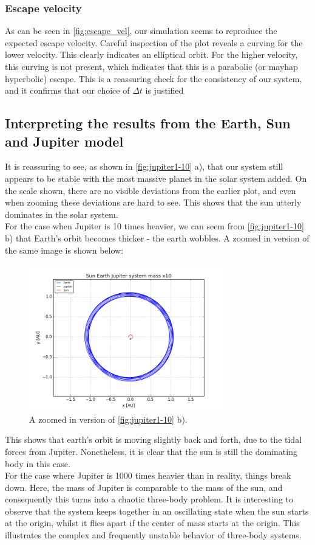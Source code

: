 \documentclass[a4paper, 10pt]{article}
\begin{document}
\subsubsection{Escape velocity}
As can be seen in \cref{fig:escape_vel}, our simulation seems to reproduce the expected escape velocity. Careful inspection of the plot reveals a curving for the lower velocity. This clearly indicates an elliptical orbit. For the higher velocity, this curving is not present, which indicates that this is a parabolic (or mayhap hyperbolic) escape. This is a reassuring check for the consistency of our system, and it confirms that our choice of $\Delta t$ is justified
\subsection{Interpreting the results from the Earth, Sun and Jupiter model}
It is reassuring to see, as shown in \cref{fig:jupiter1-10} a), that our system still appears to be stable with the most massive planet in the solar system added. On the scale shown, there are no visible deviations from the earlier plot, and even when zooming these deviations are hard to see. This shows that the sun utterly dominates in the solar system.\\
\linebreak
For the case when Jupiter is 10 times heavier, we can seem from \cref{fig:jupiter1-10} b) that Earth's orbit becomes thicker - the earth wobbles. A zoomed in version of the same image is shown below:
\begin{figure}[!ht]
    \centering
    \includegraphics[height=2.5in]{orbitESJ10Close.png}
    \caption{A zoomed in version of \cref{fig:jupiter1-10} b).}
\end{figure}
\linebreak
This shows that earth's orbit is moving slightly back and forth, due to the tidal forces from Jupiter. Nonetheless, it is clear that the sun is still the dominating body in this case.\\
\linebreak
For the case where Jupiter is 1000 times heavier than in reality, things break down. Here, the mass of Jupiter is comparable to the mass of the sun, and consequently this turns into a chaotic three-body problem. It is interesting to observe that the system keeps together in an oscillating state when the sun starts at the origin, whilst it flies apart if the center of mass starts at the origin. This illustrates the complex and frequently unstable behavior of three-body systems. 
\end{document}
